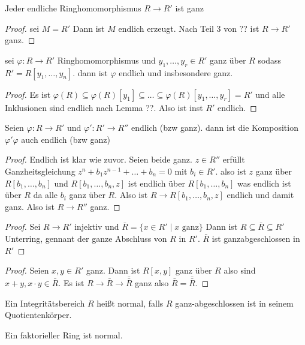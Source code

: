 \begin{Kor}
    Jeder endliche Ringhomomorphismus \(R\to R'\) ist ganz 
\end{Kor}
\begin{proof}
    sei \(M=R'\) Dann ist \(M\) endlich erzeugt. Nach Teil 3 von ?? ist \(R\to R'\) ganz.
\end{proof}
\begin{Kor}
    sei \(\varphi\colon R\to R'\) Ringhomomorphismus und \(y_1,\dots,y_r\in R'\) ganz über \(R\) sodass \(R'=R[y_1,\dots,y_n]\).
    dann ist \(\varphi\) endlich und insbesondere ganz.
\end{Kor}
\begin{proof}
    Es ist \(\varphi(R)\subseteq\varphi(R)[y_1]\subseteq\dots\subseteq \varphi(R)[y_1,\dots,y_r]=R'\) und alle Inklusionen sind endlich nach Lemma ??. Also ist inst \(R'\) endlich.
\end{proof}
\begin{Kor}
    Seien \(\varphi\colon R\to R'\) und \(\varphi'\colon R'\to R''\) endlich (bzw ganz). dann ist die Komposition \(\varphi'\varphi\) auch endlich (bzw ganz)
\end{Kor}
\begin{proof}
    Endlich ist klar wie zuvor. Seien beide ganz.
    \(z\in R''\) erfüllt Ganzheitsgleichung \(z^n+b_1z^{n-1}+\dots+b_n=0\) mit \(b_i\in R'\).
    also ist \(z\) ganz über \(R[b_1,\dots,b_n]\) und \(R[b_1,\dots,b_n,z]\) ist endlich über \(R[b_1,\dots,b_n]\) was endlich ist über \(R\) da alle \(b_i\) ganz über \(R\). Also ist \(R\to R[b_1,\dots,b_n,z]\) endlich und damit ganz.
    Also ist \(R\to R''\) ganz.
\end{proof}
\begin{proof}
    Sei \(R\to R'\) injektiv und \(\bar R=\{x\in R'\mid x \text{ ganz}\}\) Dann ist \(R\subseteq \bar R\subseteq R'\) Unterring, gennant der ganze Abschluss von \(R\) in \(R'\). \(\bar R\) ist ganzabgeschlossen in \(R'\)
\end{proof}
\begin{proof}
    Seien \(x,y\in R'\) ganz. Dann ist \(R[x,y]\) ganz über \(R\) also sind \(x+y,x\cdot y\in \bar R\). Es ist \(R\to \bar R\to \bar{\bar R}\) ganz also \(\bar R=\bar{\bar R}\).
\end{proof}
\begin{Def}
    Ein Integritätsbereich \(R\) heißt normal, falls \(R\) ganz-abgeschlossen ist in seinem Quotientenkörper.
\end{Def}
\begin{Bem}
    Ein faktorieller Ring ist normal.
\end{Bem}

